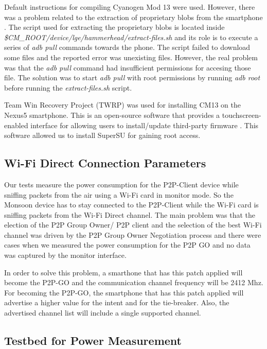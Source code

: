Default instructions \cite{cite-compilingcm13} for compiling Cyanogen Mod 13 were used. However, there was a problem related to the extraction of proprietary blobs from the smartphone \cite{cite-proprietaryblobs}. The script used for extracting the proprietary blobs is located inside \textit{\$CM_ROOT/device/lge/hammerhead/extract-files.sh} and its role is to execute a series of \textit{adb pull} commands towards the phone. The script failed to download some files and the reported error was unexisting files. However, the real problem was that the \textit{adb pull} command had insufficient permissions for accesing those file. The solution was to start \textit{adb pull} with root permissions by running \textit{adb root} before running the \textit{extract-files.sh} script.

Team Win Recovery Project (TWRP) was used for installing CM13 on the Nexus5 smartphone. This is an open-source software that provides a touchscreen-enabled interface for allowing users to install/update third-party firmware \cite{cite-twrp}. This software allowed us to install SuperSU for gaining root access.

\subsection{Wi-Fi Direct Connection Parameters}
\label{sub-sec:proj-scopep2pconnectionsectup}

Our tests measure the power consumption for the P2P-Client device while sniffing packets from the air using a Wi-Fi card in monitor mode. So the Monsoon device has to stay connected to the P2P-Client while the Wi-Fi card is sniffing packets from the Wi-Fi Direct channel. The main problem was that the election of the P2P Group Owner/ P2P client and the selection of the best Wi-Fi channel was driven by the P2P Group Owner Negotiation process and there were cases when we measured the power consumption for the P2P GO and no data was captured by the monitor interface.

In order to solve this problem, a smarthone that has this patch \cite{cite-p2ppatch} applied will become the P2P-GO and the communication channel frequency will be 2412 Mhz. For becoming the P2P-GO, the smartphone that has this patch applied will advertise a higher value for the intent and for the tie-breaker. Also, the advertised channel list will include a single supported channel.

\subsection{Testbed for Power Measurement}
\label{sub-sec:proj-scopepowertopology}


